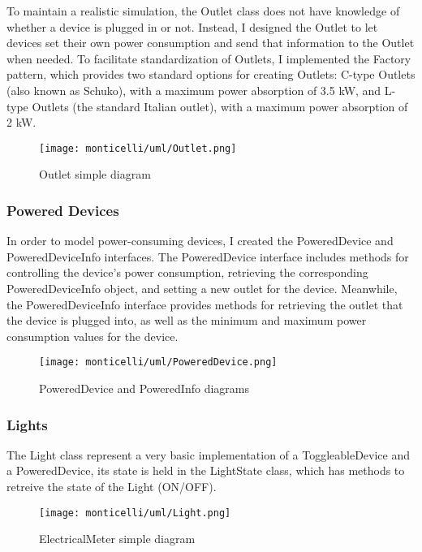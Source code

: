 To maintain a realistic simulation, the Outlet class does not have knowledge of whether a device is plugged in or not. 
Instead, I designed the Outlet to let devices set their own power consumption and send that information to the Outlet when needed. 
To facilitate standardization of Outlets, I implemented the Factory pattern, which provides two standard options for creating Outlets:
C-type Outlets (also known as Schuko), with a maximum power absorption of 3.5 kW, and L-type Outlets (the standard Italian outlet),
with a maximum power absorption of 2 kW.
\begin{figure}[H]
    \centering{}
    \texttt{[image: monticelli/uml/Outlet.png]}
    \caption{Outlet simple diagram}
    \label{monticelli:uml:outlet}
\end{figure}
\subsubsection*{Powered Devices}
In order to model power-consuming devices, I created the PoweredDevice and PoweredDeviceInfo interfaces.\newline
The PoweredDevice interface includes methods for controlling the device's power consumption, retrieving the corresponding PoweredDeviceInfo object, 
and setting a new outlet for the device. Meanwhile, the PoweredDeviceInfo interface provides methods for retrieving the outlet that the device is plugged into, 
as well as the minimum and maximum power consumption values for the device.

\begin{figure}[H]
    \centering{}
    \texttt{[image: monticelli/uml/PoweredDevice.png]}
    \caption{PoweredDevice and PoweredInfo diagrams}
    \label{monticelli:uml:poweredDevice}
\end{figure}
\subsubsection*{Lights}
The Light class represent a very basic implementation of a ToggleableDevice and a PoweredDevice, its state is held in the LightState class, which has methods to retreive the state of the Light (ON/OFF).

\begin{figure}[H]
    \centering{}
    \texttt{[image: monticelli/uml/Light.png]}
    \caption{ElectricalMeter simple diagram}
    \label{monticelli:uml:light}
\end{figure}
